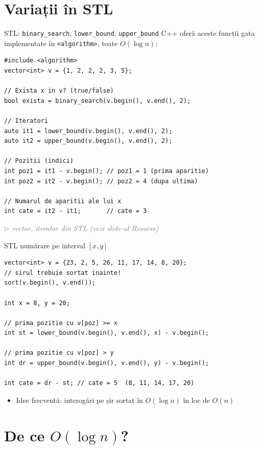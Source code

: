 ﻿\documentclass{beamer}
\newcommand{\beginnote}[1]{%
  \vfill
  {\footnotesize\textcolor{gray}{\textit{$\triangleright$ #1 (vezi slide-ul \emph{Resurse})}}}%
}
\begin{document}
\section{Variații în STL}

\begin{frame}{STL: \texttt{binary\_search}, \texttt{lower\_bound}, \texttt{upper\_bound}}
  C++ oferă aceste funcții gata implementate în \lstinline|<algorithm>|, toate $O(\log n)$:
  \begin{lstlisting}
#include <algorithm>
vector<int> v = {1, 2, 2, 2, 3, 5};

// Exista x in v? (true/false)
bool exista = binary_search(v.begin(), v.end(), 2);

// Iteratori
auto it1 = lower_bound(v.begin(), v.end(), 2);
auto it2 = upper_bound(v.begin(), v.end(), 2);

// Pozitii (indici)
int poz1 = it1 - v.begin(); // poz1 = 1 (prima aparitie)
int poz2 = it2 - v.begin(); // poz2 = 4 (dupa ultima)

// Numarul de aparitii ale lui x
int cate = it2 - it1;       // cate = 3
  \end{lstlisting}
  \beginnote{vector, iterator \textemdash{} din STL}
\end{frame}

\begin{frame}[fragile]{STL \textemdash{} numărare pe interval $[x, y]$}
  \begin{lstlisting}
vector<int> v = {23, 2, 5, 26, 11, 17, 14, 8, 20};
// sirul trebuie sortat inainte!
sort(v.begin(), v.end());

int x = 8, y = 20;

// prima pozitie cu v[poz] >= x
int st = lower_bound(v.begin(), v.end(), x) - v.begin();

// prima pozitie cu v[poz] > y
int dr = upper_bound(v.begin(), v.end(), y) - v.begin();

int cate = dr - st; // cate = 5  (8, 11, 14, 17, 20)
  \end{lstlisting}
  \begin{itemize}
    \item Idee frecventă: interogări pe șir sortat în $O(\log n)$ în loc de $O(n)$
  \end{itemize}
\end{frame}

\section{De ce $O(\log n)$?}
\end{document}
